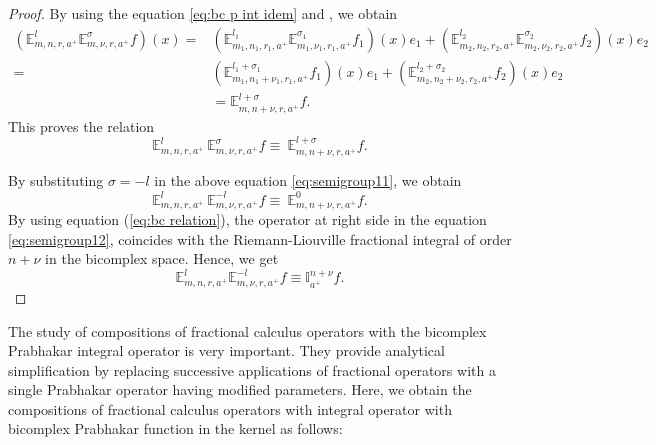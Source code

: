 \documentclass[a4paper,12pt]{article}
\theoremstyle{remark}
\begin{document}
\begin{proof}	
By using the equation  \eqref{eq:bc p int idem} and   \cite[Theorem 8, equation (6.1)]{kilbas2004generalized},
we obtain
\begin{equation}
\begin{split}
\left( \mathbb{E}^{l}_{m,n,r,a^+} \mathbb{E}^{\sigma}_{m,\nu,r,a^+}f \right)(x)=&\left( \mathbb{E}^{l_1}_{m_1,n_1,r_1,a^+} \mathbb{E}^{\sigma_1}_{m_1,\nu_1,r_1,a^+} f_1\right)(x)e_1+\left( \mathbb{E}^{l_2}_{m_2,n_2,r_2,a^+} \mathbb{E}^{\sigma_2}_{m_2,\nu_2,r_2,a^+} f_2 \right)(x)e_2\\
=& \left( \mathbb{E}^{l_1 + \sigma_1}_{m_1,n_1 + \nu_1,r_1,a^+}f_1 \right)(x)e_1+\left( \mathbb{E}^{l_2 + \sigma_2}_{m_2,n_2 + \nu_2,r_2,a^+} f_2 \right)(x)e_2\\
&=\mathbb{E}^{l+\sigma}_{m,n+\nu  ,r,a^+}f.
\end{split}
\end{equation}
\noindent This proves the relation
\begin{equation}\label{eq:semigroup11}
    \mathbb{E}^{l}_{m,n,r,a^+} \, \mathbb{E}^{\sigma}_{m,\nu,r,a^+} f \equiv\ \mathbb{E}^{l + \sigma}_{m,n + \nu,r,a^+} f.
\end{equation}

By substituting $\sigma=-l$  in the above equation \eqref{eq:semigroup11}, we obtain
\begin{equation}\label{eq:semigroup12}
    \mathbb{E}^{l}_{m,n,r,a^+} \, \mathbb{E}^{-l}_{m,\nu,r,a^+} f \equiv\ \mathbb{E}^{0}_{m,n + \nu,r,a^+} f.
\end{equation}
By using equation (\ref{eq:bc relation}), the operator at right side in the equation \eqref{eq:semigroup12}, coincides with the Riemann-Liouville fractional integral  of order $n+\nu$ in the bicomplex space. Hence, we get
\begin{equation}	\mathbb{E}^{l}_{m,n,r,a^+}\mathbb{E}^{-l}_{m,\nu ,r,a^+}	f\equiv\mathbb{I}^{n+\nu }_{a^+}f.
	\end{equation}
\end{proof}






\noindent The study of compositions of fractional calculus operators with the bicomplex Prabhakar
integral operator is very important. They
provide analytical simplification by replacing successive applications of
fractional operators with a single Prabhakar operator having modified
parameters.
Here, we obtain  the compositions of fractional calculus operators with 
integral operator with bicomplex  Prabhakar function in the kernel  as follows:
\end{document}
